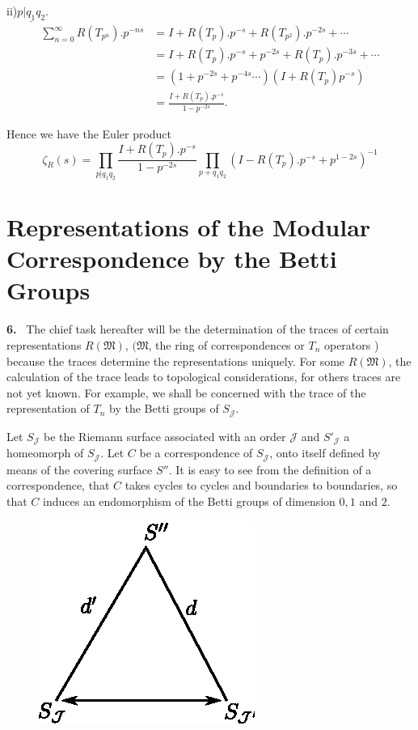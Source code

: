 \noindent ii)\pageoriginale $\underline{p \big | q_1 q_2}$.
\begin{align*}
  \sum\limits^\infty_{n=0} R(T_{p^n}).  p^{- ns} & = I +
  R(T_p). p^{-s} + R(T_{p^2}). p^{- 2s} + \cdots\\  
  & = I + R(T_p). p^{-s} + p^{-2s} + R(T_p). p^{- 3 s} + \cdots\\
  & = (1+p^{-2s}+ p^{-4s} \cdots ) (I + R(T_p) p^{-s})\\
  & = \frac{I + R(T_p).  p^{-s}}{1 - p^{- 2s}}.
\end{align*}

Hence we have the Euler product
$$
\zeta_R (s) = \prod_{p \big | q_1 q_2} \frac{I + R(T_p). p^{-s}}{1 -
  p^{-2s}} \prod_{p+q_1 q_2} (I - R(T_p). p^{-s} +  p^{1-2s})
^{-1} 
$$

\section[Representations of the Modular...]{Representations of the Modular Correspondence by the Betti
  Groups}\label{chap3:sec8}%


\textbf{6.}~ The chief task hereafter will be the determination of the traces
of certain representations $R(\mathfrak{M})$, $(\mathfrak{M}$, the
ring of correspondences or $T_n$ operators ) because the traces
determine the representations uniquely.  For some $R (\mathfrak{M})$,
the calculation of the trace leads to topological considerations, for
others traces are not yet known. For example, we shall be concerned
with the trace of the representation of $T_n$ by the Betti groups of
$S_\mathcal{J}$. 


  Let $S_{\mathcal{J}}$ be the Riemann surface associated with an order
  $\mathcal{J}$ and $S'_\mathcal{J}$ a homeomorph of
  $S_\mathcal{J}$. Let $C$ be a correspondence of $S_\mathcal{J}$, onto
  itself defined by means of the covering surface $S''$. It is easy to
  see from the definition of a correspondence, that $C$ takes cycles to
  cycles and boundaries to boundaries, so that $C$ induces an
  endomorphism of the Betti groups of dimension $0, 1$ and $2$. 
  \begin{figure}[H]
    \centerline{\includegraphics{vol9-figures/fig9-12.eps}}
  \end{figure}

